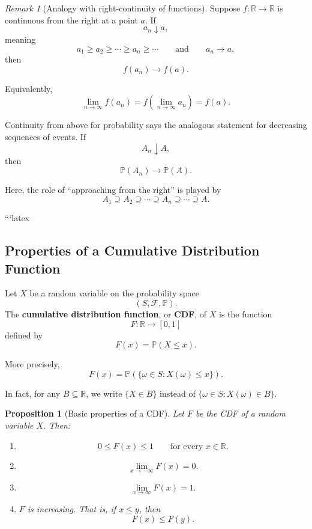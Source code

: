 \documentclass[11pt]{article}
\newcommand{\Prob}{\mathbb{P}}
\newcommand{\Sample}{S}
\newcommand{\F}{\mathcal{F}}
\theoremstyle{definition}
\theoremstyle{plain}
\newtheorem{proposition}{Proposition}
\theoremstyle{remark}
\newtheorem{remark}{Remark}
\begin{document}
\begin{remark}[Analogy with right-continuity of functions] Suppose $f:\mathbb{R}\to\mathbb{R}$ is continuous from the right at a point $a$. If
\[
a_n\downarrow a,
\]
meaning
\[
a_1\ge a_2\ge \cdots \ge a_n\ge \cdots
\qquad \text{and} \qquad
a_n\to a,
\]
then
\[
f(a_n)\to f(a).
\]

Equivalently,
\[
\lim_{n\to\infty} f(a_n)
=
f\left(\lim_{n\to\infty}a_n\right)
=
f(a).
\]

Continuity from above for probability says the analogous statement for decreasing sequences of events. If
\[
A_n\downarrow A,
\]
then
\[
\Prob(A_n)\to \Prob(A).
\]

Here, the role of ``approaching from the right'' is played by
\[
A_1\supseteq A_2\supseteq \cdots \supseteq A_n\supseteq \cdots \supseteq A.
\]
\end{remark}











```latex
\subsection*{Properties of a Cumulative Distribution Function}

Let $X$ be a random variable on the probability space
\[
(\Sample,\F,\Prob).
\]
The \textbf{cumulative distribution function}, or \textbf{CDF}, of $X$ is the function
\[
F:\mathbb{R}\to[0,1]
\]
defined by
\[
F(x)=\Prob(X\le x).
\]

More precisely,
\[
F(x)=\Prob(\{\omega\in\Sample:X(\omega)\le x\}).
\]

In fact, for any $B\subseteq \mathbb{R}$, we write $\{X \in B\}$ instead of  $\{\omega\in\Sample:X(\omega) \in B\}.$




\begin{proposition}[Basic properties of a CDF]
Let $F$ be the CDF of a random variable $X$. Then:

\begin{enumerate}[label=(\arabic*)]

\item
\[
0\le F(x)\le 1
\qquad
\text{for every }x\in\mathbb{R}.
\]

\item
\[
\lim_{x\to-\infty}F(x)=0.
\]

\item
\[
\lim_{x\to\infty}F(x)=1.
\]

\item $F$ is increasing. That is, if $x\le y$, then
\[
F(x)\le F(y).
\]

\end{enumerate}
\end{proposition}
\end{document}
